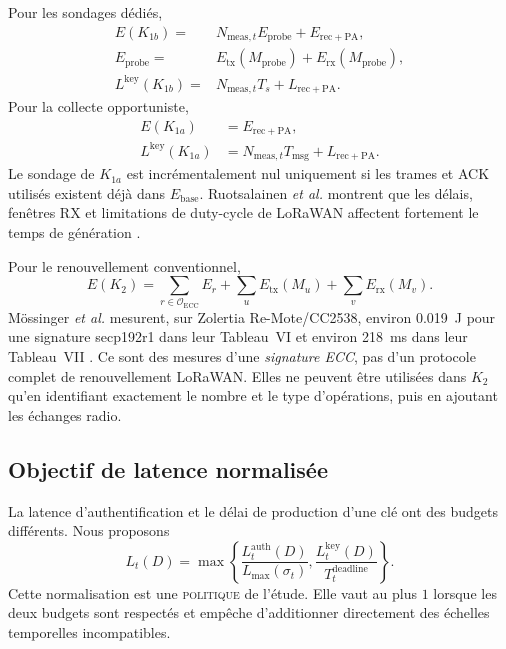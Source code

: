 \documentclass[conference,a4paper]{IEEEtran}
\newcommand{\statusPol}{\textsc{politique}}
\begin{document}
Pour les sondages dédiés,
\begin{align}
E(K_{1b})={}&N_{\mathrm{meas},t}
E_{\mathrm{probe}}+E_{\mathrm{rec+PA}},
\label{eq:k1b-energy}\\
E_{\mathrm{probe}}={}&E_{\mathrm{tx}}(M_{\mathrm{probe}})
+E_{\mathrm{rx}}(M_{\mathrm{probe}}),\\
L^{\mathrm{key}}(K_{1b})={}&N_{\mathrm{meas},t}T_s+L_{\mathrm{rec+PA}}.
\label{eq:k1b-latency}
\end{align}
Pour la collecte opportuniste,
\begin{align}
E(K_{1a})&=E_{\mathrm{rec+PA}},
\label{eq:k1a-energy}\\
L^{\mathrm{key}}(K_{1a})&=N_{\mathrm{meas},t}T_{\mathrm{msg}}+L_{\mathrm{rec+PA}}.
\label{eq:k1a-latency}
\end{align}
Le sondage de $K_{1a}$ est incrémentalement nul uniquement si les trames et ACK utilisés existent déjà dans $E_{\mathrm{base}}$. Ruotsalainen \emph{et al.} montrent que les délais, fenêtres RX et limitations de duty-cycle de LoRaWAN affectent fortement le temps de génération \cite[Secs.~I, V-C]{ruotsalainen2020}.

Pour le renouvellement conventionnel,
\begin{equation}
E(K_2)=\sum_{r\in\mathcal O_{\mathrm{ECC}}}E_r+
\sum_u E_{\mathrm{tx}}(M_u)+\sum_v E_{\mathrm{rx}}(M_v).
\label{eq:k2-cost}
\end{equation}
Mössinger \emph{et al.} mesurent, sur Zolertia Re-Mote/CC2538, environ \SI{0.019}{J} pour une signature secp192r1 dans leur Tableau~VI et environ \SI{218}{ms} dans leur Tableau~VII \cite[Tabs.~VI--VII]{mossinger2016}. Ce sont des mesures d'une \emph{signature ECC}, pas d'un protocole complet de renouvellement LoRaWAN. Elles ne peuvent être utilisées dans $K_2$ qu'en identifiant exactement le nombre et le type d'opérations, puis en ajoutant les échanges radio.

\subsection{Objectif de latence normalisée}
La latence d'authentification et le délai de production d'une clé ont des budgets différents. Nous proposons
\begin{equation}
L_t(D)=\max\left\{
\frac{L_t^{\mathrm{auth}}(D)}{L_{\max}(\sigma_t)},
\frac{L_t^{\mathrm{key}}(D)}{T_t^{\mathrm{deadline}}}
\right\}.
\label{eq:normalized-latency}
\end{equation}
Cette normalisation est une \statusPol{} de l'étude. Elle vaut au plus $1$ lorsque les deux budgets sont respectés et empêche d'additionner directement des échelles temporelles incompatibles.
\end{document}
